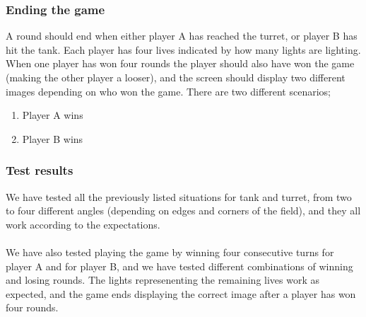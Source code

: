 \subsubsection{Ending the game}
A round should end when either player A has reached the turret, or player B has hit the tank.
Each player has four lives indicated by how many lights are lighting. When one player has won
four rounds the player should also have won the game (making the other player a looser), 
and the screen should display two different images depending on who won the game. There are
two different scenarios;
\begin{enumerate}
  \item Player A wins
  \item Player B wins
\end{enumerate}

\subsubsection{Test results}
We have tested all the previously listed situations for tank and turret, from two to four
different angles (depending on edges and corners of the field), and they all work
according to the expectations. \\
\\
We have also tested playing the game by winning four consecutive turns for player A and for 
player B, and we have tested different combinations of winning and losing rounds. 
The lights represenenting the remaining lives work as expected, and the game ends displaying
the correct image after a player has won four rounds.